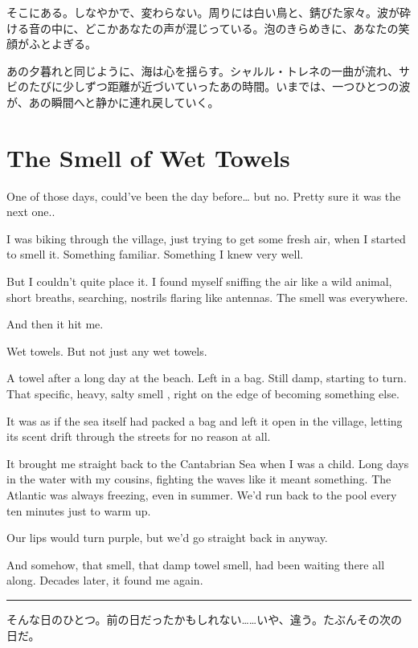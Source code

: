 \documentclass[
  letterpaper,
  oneside]{scrbook}
\begin{document}
そこにある。しなやかで、変わらない。周りには白い鳥と、錆びた家々。波が砕ける音の中に、どこかあなたの声が混じっている。泡のきらめきに、あなたの笑顔がふとよぎる。

あの夕暮れと同じように、海は心を揺らす。シャルル・トレネの一曲が流れ、サビのたびに少しずつ距離が近づいていったあの時間。いまでは、一つひとつの波が、あの瞬間へと静かに連れ戻していく。


\chapter{The Smell of Wet Towels}\label{the-smell-of-wet-towels}

One of those days, could've been the day before\ldots{} but no. Pretty
sure it was the next one..

I was biking through the village, just trying to get some fresh air,
when I started to smell it. Something familiar. Something I knew very
well.

But I couldn't quite place it. I found myself sniffing the air like a
wild animal, short breaths, searching, nostrils flaring like antennas.
The smell was everywhere.

And then it hit me.

Wet towels. But not just any wet towels.

A towel after a long day at the beach. Left in a bag. Still damp,
starting to turn. That specific, heavy, salty smell , right on the edge
of becoming something else.

It was as if the sea itself had packed a bag and left it open in the
village, letting its scent drift through the streets for no reason at
all.

It brought me straight back to the Cantabrian Sea when I was a child.
Long days in the water with my cousins, fighting the waves like it meant
something. The Atlantic was always freezing, even in summer. We'd run
back to the pool every ten minutes just to warm up.

Our lips would turn purple, but we'd go straight back in anyway.

And somehow, that smell, that damp towel smell, had been waiting there
all along. Decades later, it found me again.

\begin{center}\rule{0.5\linewidth}{0.5pt}\end{center}

そんな日のひとつ。前の日だったかもしれない\ldots\ldots いや、違う。たぶんその次の日だ。
\end{document}
